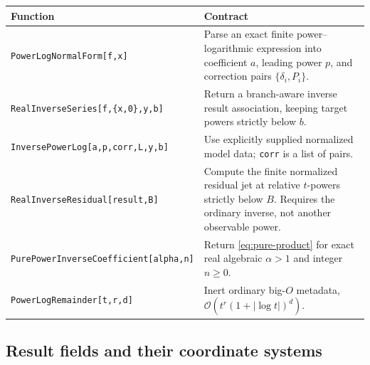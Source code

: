 \documentclass[11pt,a4paper]{article}
\numberwithin{equation}{section}
\theoremstyle{definition}\newtheorem{definition}[theorem]{Definition}
\theoremstyle{remark}\newtheorem{remark}[theorem]{Remark}
\newcommand{\OO}{\mathcal O}\newcommand{\dd}{\mathrm d}
\newcommand{\code}[1]{\texttt{#1}}
\begin{document}
\begin{longtable}{@{}>{\raggedright\arraybackslash}p{}>{\raggedright\arraybackslash}p{}@{}}
\toprule
Function & Contract \\
\midrule
\endhead
\code{PowerLogNormalForm}\newline\code{[f,x]} & Parse an exact finite power--logarithmic
expression into coefficient $a$, leading power $p$, and correction pairs
$\{\delta_i,P_i\}$. \\
\addlinespace
\code{RealInverseSeries}\newline\code{[f,\{x,0\},y,b]} & Return a branch-aware inverse
result association, keeping target powers strictly below $b$. \\
\addlinespace
\code{InversePowerLog}\newline\code{[a,p,corr,L,y,b]} & Use explicitly supplied normalized
model data; \code{corr} is a list of pairs. \\
\addlinespace
\code{RealInverseResidual}\newline\code{[result,B]} & Compute the finite normalized
residual jet at relative $t$-powers strictly below $B$. Requires the
ordinary inverse, not another observable power. \\
\addlinespace
\code{PurePowerInverseCoefficient}\newline\code{[alpha,n]} & Return
\cref{eq:pure-product} for exact real algebraic $\alpha>1$ and integer
$n\ge0$. \\
\addlinespace
\code{PowerLogRemainder}\newline\code{[t,r,d]} & Inert ordinary big-$O$ metadata,
$\OO(t^r(1+|\log t|)^d)$. \\
\bottomrule
\end{longtable}

\subsection{Result fields and their coordinate systems}
\end{document}
